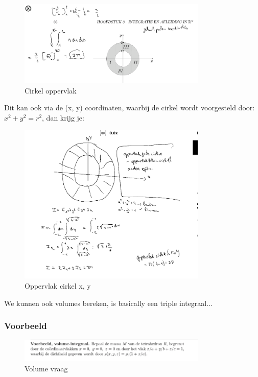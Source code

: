 \documentclass[a4paper]{article}
\begin{document}
\begin{figure}[H]
	\centering
	\includegraphics[width=0.8\textwidth]{assets/circkel_oppervlak.png}
	\caption{Cirkel oppervlak}
	\label{fig:circkel_oppervlak}
\end{figure}

Dit kan ook via de (x, y) coordinaten, waarbij de cirkel wordt voorgesteld door: $x^2 + y^2 = r^2$, dan krijg je:


\begin{figure}[H]
	\centering
	\includegraphics[width=0.8\textwidth]{assets/oppervlak_cirkel_x_y.png}
	\caption{Oppervlak cirkel x, y}
	\label{fig:oppervlak_cirkel_x_y}
\end{figure}

We kunnen ook volumes bereken, is basically een triple integraal...

\subsubsection{Voorbeeld}


\begin{figure}[H]
	\centering
	\includegraphics[width=0.8\textwidth]{assets/volume_vraag.png}
	\caption{Volume vraag}
	\label{fig:volume_vraag}
\end{figure}
\end{document}
